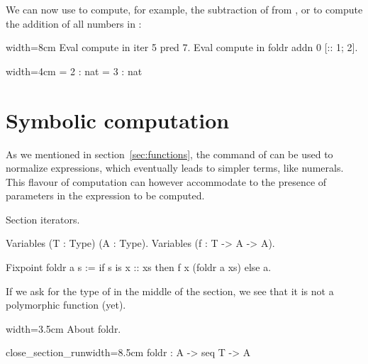 We can now use  to compute, for example,
the subtraction of  from , or 
to compute the
addition of all numbers in \C{[:: 1; 2]}:

\begin{coq}{}{width=8cm}
Eval compute in iter 5 pred 7.
Eval compute in foldr addn 0 [:: 1; 2].
\end{coq}
\begin{coqout}{}{width=4cm}
 = 2 : nat
 = 3 : nat
\end{coqout}



\section{Symbolic computation}\label{sec:symcomp}

As we mentioned in section~\ref{sec:functions}, the 
command of \Coq{} can be used to normalize expressions, which
eventually leads to simpler terms, like numerals. This flavour of
computation can however accommodate to the presence of parameters in
the expression to be computed.


\begin{coq}{}{}
Section iterators.

Variables (T : Type) (A : Type).
Variables (f : T -> A -> A).

Fixpoint foldr a s :=
  if s is x :: xs then f x (foldr a xs) else a.
\end{coq}

If we ask for the type of
 in the middle of the section, we see that
it is not a polymorphic function (yet).

\begin{coq}{}{width=3.5cm}
About foldr.
\end{coq}
\begin{coqout}{close_section_run}{width=8.5cm}
foldr : A -> seq T -> A
\end{coqout}

